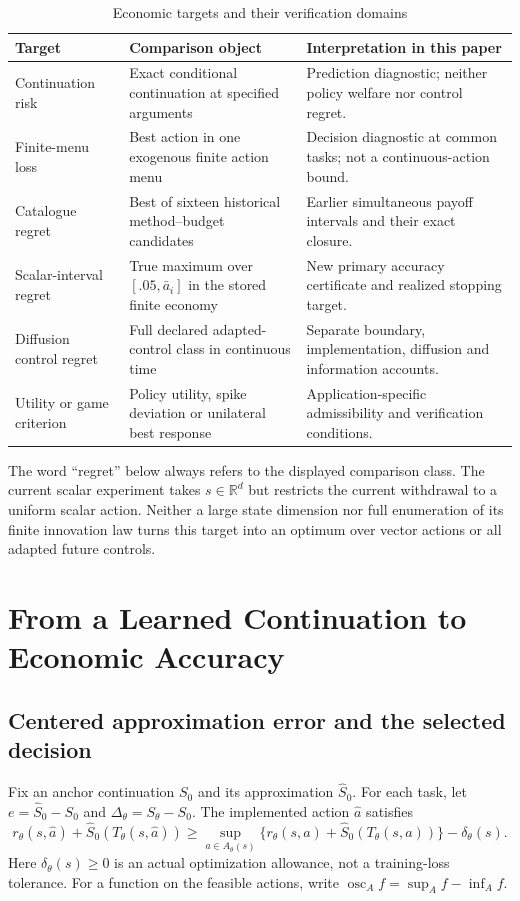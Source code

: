 \documentclass[ecta,nameyear,draft]{econsocart}
\theoremstyle{definition}
\theoremstyle{remark}
\newcommand{\R}{\mathbb R}
\begin{document}
\begin{table}[htbp]\centering\small
\caption{Economic targets and their verification domains}\label{tab:r19targets}
\begin{tabular}{p{}p{}p{}}
\toprule Target & Comparison object & Interpretation in this paper\\\midrule
Continuation risk & Exact conditional continuation at specified arguments &
Prediction diagnostic; neither policy welfare nor control regret.\\
Finite-menu loss & Best action in one exogenous finite action menu &
Decision diagnostic at common tasks; not a continuous-action bound.\\
Catalogue regret & Best of sixteen historical method--budget candidates &
Earlier simultaneous payoff intervals and their exact closure.\\
Scalar-interval regret & True maximum over $[.05,\bar a_i]$ in the stored finite economy &
New primary accuracy certificate and realized stopping target.\\
Diffusion control regret & Full declared adapted-control class in continuous time &
Separate boundary, implementation, diffusion and information accounts.\\
Utility or game criterion & Policy utility, spike deviation or unilateral best response &
Application-specific admissibility and verification conditions.\\\bottomrule
\end{tabular}
\end{table}

The word ``regret'' below always refers to the displayed comparison class.
The current scalar experiment takes $s\in\R^d$ but restricts the current
withdrawal to a uniform scalar action. Neither a large state dimension nor
full enumeration of its finite innovation law turns this target into an
optimum over vector actions or all adapted future controls.

\section{From a Learned Continuation to Economic Accuracy}\label{sec:r19decision}
\subsection{Centered approximation error and the selected decision}
Fix an anchor continuation $S_0$ and its approximation $\widehat S_0$.
For each task, let $e=\widehat S_0-S_0$ and
$\Delta_\theta=S_\theta-S_0$. The implemented action $\widehat a$ satisfies
\begin{equation}
 r_\theta(s,\widehat a)+\widehat S_0(T_\theta(s,\widehat a))
 \geq \sup_{a\in A_\theta(s)}
 \{r_\theta(s,a)+\widehat S_0(T_\theta(s,a))\}-\delta_\theta(s).
 \label{eq:r19greedy}
\end{equation}
Here $\delta_\theta(s)\geq0$ is an actual optimization allowance, not a
training-loss tolerance. For a function on the feasible actions, write
$\operatorname{osc}_A f=\sup_A f-\inf_A f$.
\end{document}
